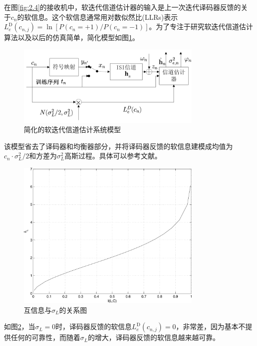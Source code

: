 在图\ref{fig:2.4}的接收机中，软迭代信道估计器的输入是上一次迭代译码器反馈的关于$c_n$的软信息。这个软信息通常用对数似然比(LLRs)表示$L_e^{\mathrm{D}}(c_{n,j})=\ln[P(c_n=+1)/P(c_n=-1)]$。为了专注于研究软迭代信道估计算法以及以后的仿真简单，简化模型如图\ref{fig:4.1}。
\begin{figure}[htb]
  \begin{center}
    \includegraphics[width=0.8\textwidth]{images/channel.pdf}
  \end{center}
  \caption{简化的软迭代信道估计系统模型}
  \label{fig:4.1}
\end{figure}
该模型省去了译码器和均衡器部分，并将译码器反馈的软信息建模成均值为$c_n\cdot\sigma_L^2/2$和方差为$\sigma_L^2$高斯过程。具体可以参考文献。
\begin{figure}[htb]
  \begin{center}
    \includegraphics[width=0.8\textwidth]{images/relation.pdf}
  \end{center}
  \caption{互信息与$\sigma_L$的关系图}
  \label{fig:4.2}
\end{figure}
如图\ref{fig:4.2}，当$\sigma_L=0$时，译码器反馈的软信息$L_e^{\mathrm{D}}(c_{n,j})=0$，非常差，因为基本不提供任何的可靠性，而随着$\sigma_L$的增大，译码器反馈的软信息越来越可靠。

